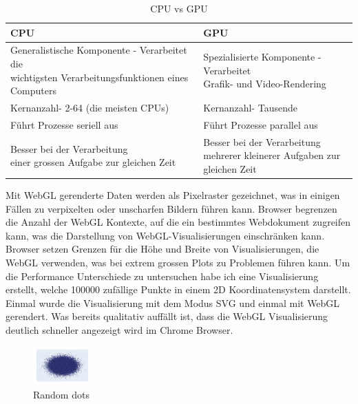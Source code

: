 \documentclass{article}
\begin{document}
\begin{table}[!h]
\centering
\begin{tabular}{|l|l|}
\hline
\textbf{CPU} & \textbf{GPU} \\
\hline
\makecell[l]{Generalistische Komponente - Verarbeitet die \\ wichtigsten Verarbeitungsfunktionen eines Computers}& \makecell[l]{Spezialisierte Komponente - Verarbeitet \\Grafik- und Video-Rendering} \\
\hline
Kernanzahl- 2-64 (die meisten CPUs)&Kernanzahl- Tausende \\
\hline
Führt Prozesse seriell aus & Führt Prozesse parallel aus\\
\hline
\makecell[l]{Besser bei der Verarbeitung\\ einer grossen Aufgabe zur gleichen Zeit} & \makecell[l]{Besser bei der Verarbeitung \\mehrerer kleinerer Aufgaben zur gleichen Zeit} \\
\hline
\end{tabular}
\caption{\label{tab: LE1 CPU vs GPU}CPU vs GPU}
\end{table}
    
\noindent
Mit WebGL gerenderte Daten werden als Pixelraster gezeichnet, was in einigen Fällen zu verpixelten oder unscharfen Bildern führen kann.
Browser begrenzen die Anzahl der WebGL Kontexte, auf die ein bestimmtes Webdokument zugreifen kann, was die Darstellung von WebGL-Visualisierungen einschränken kann.
Browser setzen Grenzen für die Höhe und Breite von Visualisierungen, die WebGL verwenden, was bei extrem grossen Plots zu Problemen führen kann.\cite{plotly_webgl_nodate}
\newline
\newline
Um die Performance Unterschiede zu untersuchen habe ich eine Visualisierung erstellt, welche 100000 zufällige Punkte in einem 2D Koordinatensystem darstellt.
Einmal wurde die Visualisierung mit dem Modus SVG und einmal mit WebGL gerendert. Was bereits qualitativ auffällt ist, dass die WebGL Visualisierung deutlich schneller angezeigt wird im Chrome Browser.

\begin{figure}[!h]
\centering
\includegraphics[width=0.2\textwidth]{img/random_dots.png}
\caption{\label{fig: LE1 Random Dots plot}Random dots}
\end{figure}
\end{document}

